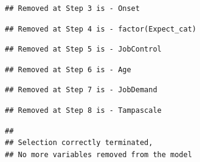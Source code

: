 \documentclass[
]{book}
\newenvironment{Shaded}{\begin{snugshade}}{\end{snugshade}}
\newcommand{\NormalTok}[1]{#1}
\newcommand{\SpecialCharTok}[1]{\textcolor[rgb]{0.00,0.00,0.00}{#1}}
\begin{document}
\begin{verbatim}
## Removed at Step 3 is - Onset
\end{verbatim}

\begin{verbatim}
## Removed at Step 4 is - factor(Expect_cat)
\end{verbatim}

\begin{verbatim}
## Removed at Step 5 is - JobControl
\end{verbatim}

\begin{verbatim}
## Removed at Step 6 is - Age
\end{verbatim}

\begin{verbatim}
## Removed at Step 7 is - JobDemand
\end{verbatim}

\begin{verbatim}
## Removed at Step 8 is - Tampascale
\end{verbatim}

\begin{verbatim}
## 
## Selection correctly terminated, 
## No more variables removed from the model
\end{verbatim}

\begin{Shaded}
\end{Shaded}
\end{document}
